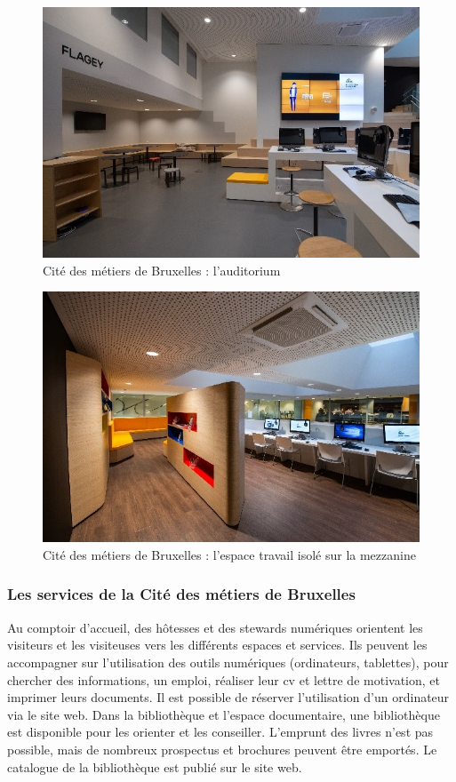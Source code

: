 \documentclass[french,a4paper,12pt]{article}
\begin{document}
\begin{figure}
\caption{Cité des métiers de Bruxelles : l'auditorium}
\includegraphics[scale=0.9]{5-cdm-auditorium.JPG}
\end{figure}
\begin{figure}
\caption{Cité des métiers de Bruxelles : l'espace travail isolé sur la mezzanine }
\includegraphics[scale=0.9]{6-cdm-espace_de_travail.JPG}
\end{figure}



\subsubsection{Les services de la Cité des métiers de Bruxelles}

\quad Au comptoir d’accueil, des hôtesses et des stewards numériques orientent les visiteurs et les visiteuses vers les différents espaces et services. Ils peuvent les accompagner sur l’utilisation des outils numériques (ordinateurs, tablettes), pour chercher des informations, un emploi, réaliser leur cv et lettre de motivation, et imprimer leurs documents. Il est possible de réserver l’utilisation d’un ordinateur via le site web.
\quad Dans la bibliothèque et l’espace documentaire, une bibliothèque est disponible pour les orienter et les conseiller. L’emprunt des livres n’est pas possible, mais de nombreux prospectus et brochures peuvent être emportés. Le catalogue de la bibliothèque est publié sur le site web.
\end{document}
